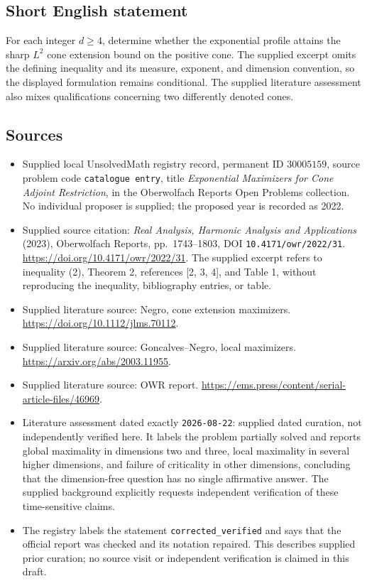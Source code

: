 \documentclass[11pt]{article}
\begin{document}
\subsection{Short English statement}
For each integer \(d\geq4\), determine whether the exponential profile attains the sharp \(L^2\) cone extension bound on the positive cone. The supplied excerpt omits the defining inequality and its measure, exponent, and dimension convention, so the displayed formulation remains conditional. The supplied literature assessment also mixes qualifications concerning two differently denoted cones.
\subsection{Sources}
\begin{itemize}
\item Supplied local UnsolvedMath registry record, permanent ID \(30005159\), source problem code \texttt{catalogue entry}, title \emph{Exponential Maximizers for Cone Adjoint Restriction}, in the Oberwolfach Reports Open Problems collection. No individual proposer is supplied; the proposed year is recorded as 2022.
\item Supplied source citation: \emph{Real Analysis, Harmonic Analysis and Applications} (2023), Oberwolfach Reports, pp.\ 1743--1803, DOI \texttt{10.4171/owr/2022/31}. \url{https://doi.org/10.4171/owr/2022/31}. The supplied excerpt refers to inequality (2), Theorem 2, references [2, 3, 4], and Table 1, without reproducing the inequality, bibliography entries, or table.
\item Supplied literature source: Negro, cone extension maximizers. \url{https://doi.org/10.1112/jlms.70112}.
\item Supplied literature source: Goncalves--Negro, local maximizers. \url{https://arxiv.org/abs/2003.11955}.
\item Supplied literature source: OWR report. \url{https://ems.press/content/serial-article-files/46969}.
\item Literature assessment dated exactly \texttt{2026-08-22}: supplied dated curation, not independently verified here. It labels the problem partially solved and reports global maximality in dimensions two and three, local maximality in several higher dimensions, and failure of criticality in other dimensions, concluding that the dimension-free question has no single affirmative answer. The supplied background explicitly requests independent verification of these time-sensitive claims.
\item The registry labels the statement \texttt{corrected\_verified} and says that the official report was checked and its notation repaired. This describes supplied prior curation; no source visit or independent verification is claimed in this draft.
\end{itemize}
\end{document}
